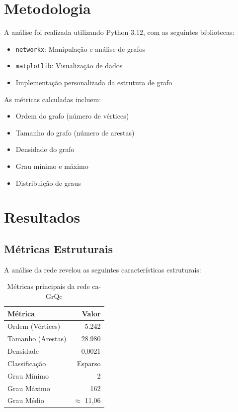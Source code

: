 \documentclass[12pt,a4paper]{article}
\begin{document}
\section{Metodologia}

A análise foi realizada utilizando Python 3.12, com as seguintes bibliotecas:

\begin{itemize}
    \item \texttt{networkx}: Manipulação e análise de grafos
    \item \texttt{matplotlib}: Visualização de dados
    \item Implementação personalizada da estrutura de grafo
\end{itemize}

As métricas calculadas incluem:
\begin{itemize}
    \item Ordem do grafo (número de vértices)
    \item Tamanho do grafo (número de arestas)
    \item Densidade do grafo
    \item Grau mínimo e máximo
    \item Distribuição de graus
\end{itemize}

\section{Resultados}

\subsection{Métricas Estruturais}


A análise da rede revelou as seguintes características estruturais:

\begin{table}[H]
\centering
\caption{Métricas principais da rede ca-GrQc}
\begin{tabular}{|l|r|}
\hline
\textbf{Métrica} & \textbf{Valor} \\
\hline
Ordem (Vértices) & 5.242 \\
Tamanho (Arestas) & 28.980 \\
Densidade & 0,0021 \\
Classificação & Esparso \\
Grau Mínimo & 2 \\
Grau Máximo & 162 \\
Grau Médio & $\approx$ 11,06 \\
\hline
\end{tabular}
\end{table}
\end{document}
